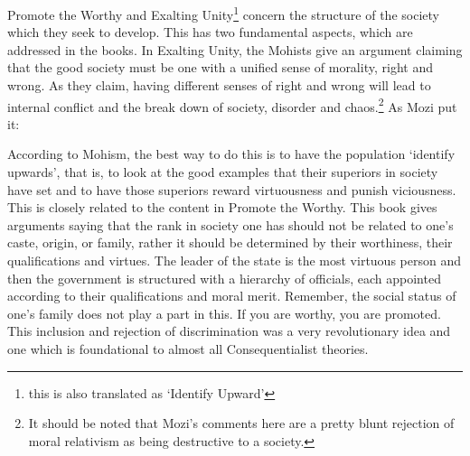 Promote the Worthy and Exalting Unity\footnote{this is also translated as `Identify Upward'} concern the structure of the society which they seek to develop. This has two fundamental aspects, which are addressed in the books. In Exalting Unity, the Mohists give an argument claiming that the good society must be one with a unified sense of morality, right and wrong. As they claim, having different senses of right and wrong will lead to internal conflict and the break down of society, disorder and chaos.\footnote{It should be noted that Mozi's comments here are a pretty blunt rejection of moral relativism as being destructive to a society.} As Mozi put it: 


According to Mohism, the best way to do this is to have the population `identify upwards', that is, to look at the good examples that their superiors in society have set and to have those superiors reward virtuousness and punish viciousness. This is closely related to the content in Promote the Worthy. This book gives arguments saying that the rank in society one has should not be related to one's caste, origin, or family, rather it should be determined by their worthiness, their qualifications and virtues. The leader of the state is the most virtuous person and then the government is structured with a hierarchy of officials, each appointed according to their qualifications and moral merit. Remember, the social status of one's family does not play a part in this. If you are worthy, you are promoted. This inclusion and rejection of discrimination was a very revolutionary idea and one which is foundational to almost all Consequentialist theories. 

